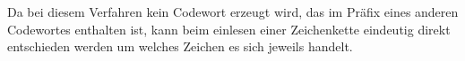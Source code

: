 Da bei diesem Verfahren kein Codewort erzeugt wird, das im Präfix eines anderen Codewortes enthalten ist, kann beim einlesen einer Zeichenkette eindeutig direkt entschieden werden um welches Zeichen es sich jeweils handelt.
%
%

